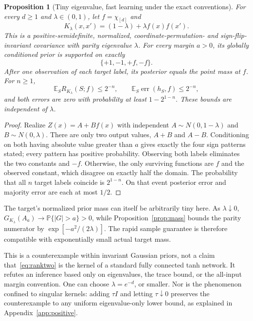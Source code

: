 \documentclass[11pt]{article}
\newtheorem{proposition}[theorem]{Proposition}
\theoremstyle{remark}\newtheorem{remark}[theorem]{Remark}
\newcommand{\E}{\mathbb E}
\newcommand{\PP}{\mathbb P}
\newcommand{\abs}[1]{\left|#1\right|}
\begin{document}
\begin{proposition}[Tiny eigenvalue, fast learning under the exact conventions]\label{prop:fast}
For every $d\ge1$ and $\lambda\in(0,1)$, let $f=\chi_{[d]}$ and
\begin{equation}\label{eq:ranktwo}
 K_\lambda(x,x')=(1-\lambda)+\lambda f(x)f(x').
\end{equation}
This is a positive-semidefinite, normalized, coordinate-permutation- and sign-flip-invariant covariance with parity eigenvalue $\lambda$. For every margin $a>0$, its globally conditioned prior is supported on exactly
\[
 \{+1,-1,+f,-f\}.
\]
After one observation of each target label, its posterior equals the point mass at $f$. For $n\ge1$,
\begin{equation}\label{eq:fast}
 \E_S R_{K_\lambda}(S;f)\le2^{-n},
 \qquad \E_S\operatorname{err}(h_S,f)\le2^{-n},
\end{equation}
and both errors are zero with probability at least $1-2^{1-n}$. These bounds are independent of $\lambda$.
\end{proposition}
\begin{proof}
Realize $Z(x)=A+Bf(x)$ with independent $A\sim N(0,1-\lambda)$ and $B\sim N(0,\lambda)$. There are only two output values, $A+B$ and $A-B$. Conditioning on both having absolute value greater than $a$ gives exactly the four sign patterns stated; every pattern has positive probability. Observing both labels eliminates the two constants and $-f$. Otherwise, the only surviving functions are $f$ and the observed constant, which disagree on exactly half the domain. The probability that all $n$ target labels coincide is $2^{1-n}$. On that event posterior error and majority error are each at most $1/2$.
\end{proof}
The target's normalized prior mass can itself be arbitrarily tiny here. As $\lambda\downarrow0$, $G_{K_\lambda}(A_a)\to\PP\{\abs G>a\}>0$, while Proposition~\ref{prop:mass} bounds the parity numerator by $\exp[-a^2/(2\lambda)]$. The rapid sample guarantee is therefore compatible with exponentially small actual target mass.

This is a counterexample within invariant Gaussian priors, not a claim that~\eqref{eq:ranktwo} is the kernel of a standard fully connected tanh network. It refutes an inference based only on eigenvalues, the trace bound, or the all-input margin convention. One can choose $\lambda=e^{-d}$, or smaller. Nor is the phenomenon confined to singular kernels: adding $\tau I$ and letting $\tau\downarrow0$ preserves the counterexample to any uniform eigenvalue-only lower bound, as explained in Appendix~\ref{app:positive}.
\end{document}
